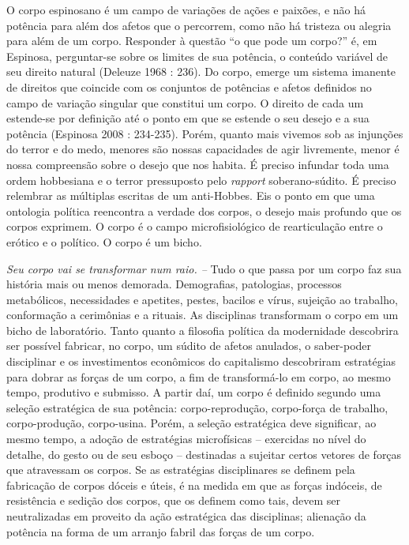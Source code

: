 O corpo espinosano é um campo de variações de ações e paixões, e não há
potência para além dos afetos que o percorrem, como não há tristeza ou
alegria para além de um corpo. Responder à questão ``o que pode um
corpo?'' é, em Espinosa, perguntar-se sobre os limites de sua potência,
o conteúdo variável de seu direito natural (Deleuze 1968 : 236). Do
corpo, emerge um sistema imanente de direitos que coincide com os
conjuntos de potências e afetos definidos no campo de variação singular
que constitui um corpo. O direito de cada um estende-se por definição
até o ponto em que se estende o seu desejo e a sua potência (Espinosa
2008 : 234-235). Porém, quanto mais vivemos sob as injunções do terror e
do medo, menores são nossas capacidades de agir livremente, menor é
nossa compreensão sobre o desejo que nos habita. É preciso infundar toda
uma ordem hobbesiana e o terror pressuposto pelo \emph{rapport
}soberano-súdito. É preciso relembrar as múltiplas escritas de um
anti-Hobbes. Eis o ponto em que uma ontologia política reencontra a
verdade dos corpos, o desejo mais profundo que os corpos exprimem. O
corpo é o campo microfisiológico de rearticulação entre o erótico e o
político. O corpo é um bicho.

\emph{Seu corpo vai se transformar num raio. -- }Tudo o que passa por um
corpo faz sua história mais ou menos demorada. Demografias, patologias,
processos metabólicos, necessidades e apetites, pestes, bacilos e vírus,
sujeição ao trabalho, conformação a cerimônias e a rituais. As
disciplinas transformam o corpo em um bicho de laboratório. Tanto quanto
a filosofia política da modernidade descobrira ser possível fabricar, no
corpo, um súdito de afetos anulados, o saber-poder disciplinar e os
investimentos econômicos do capitalismo descobriram estratégias para
dobrar as forças de um corpo, a fim de transformá-lo em corpo, ao mesmo
tempo, produtivo e submisso. A partir daí, um corpo é definido segundo
uma seleção estratégica de sua potência: corpo-reprodução, corpo-força
de trabalho, corpo-produção, corpo-usina. Porém, a seleção estratégica
deve significar, ao mesmo tempo, a adoção de estratégias microfísicas --
exercidas no nível do detalhe, do gesto ou de seu esboço -- destinadas a
sujeitar certos vetores de forças que atravessam os corpos. Se as
estratégias disciplinares se definem pela fabricação de corpos dóceis e
úteis, é na medida em que as forças indóceis, de resistência e sedição
dos corpos, que os definem como tais, devem ser neutralizadas em
proveito da ação estratégica das disciplinas; alienação da potência na
forma de um arranjo fabril das forças de um corpo.

